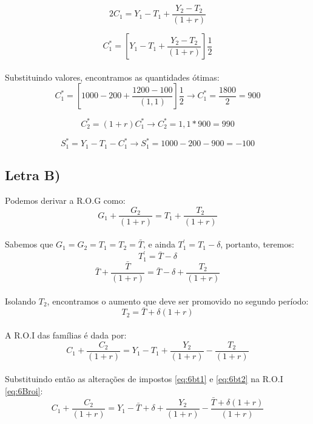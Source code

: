 \documentclass{article}
\begin{document}
\begin{equation}
    2C_1 = Y_1 - T_1 + \frac{Y_2-T_2}{(1+r)}
\end{equation}

\begin{equation}
    C_1^* = \left[Y_1 - T_1 + \frac{Y_2-T_2}{(1+r)}\right]\frac{1}{2}
\end{equation}
\\
Substituindo valores, encontramos as quantidades ótimas:
\begin{equation}
    C_1^* = \left[1000 - 200 + \frac{1200-100}{(1,1)}\right]\frac{1}{2} \to C_1^* = \frac{1800}{2} = 900
\end{equation}

\begin{equation}
    C_2^* = (1+r)C_1^* \to C_2^* = 1,1*900 = 990
\end{equation}

\begin{equation}
    S_1^* = Y_1-T_1-C_1^* \to S_1^*=1000-200-900 = -100
\end{equation}
\clearpage

\subsection*{Letra B)}
Podemos derivar a R.O.G como:
\begin{equation}\label{eq:6Brog}
    G_1 + \frac{G_2}{(1+r)} = T_1 + \frac{T_2}{(1+r)}
\end{equation}
\\
Sabemos que $G_1=G_2=T_1=T_2=\bar{T}$, e ainda $T_{1}^{'}=T_1-\delta$, portanto, teremos:
\begin{equation}\label{eq:6bt1}
    T_{1}^{'}=\bar{T}-\delta
\end{equation}
\begin{equation}
    \bar{T}+\frac{\bar{T}}{(1+r)}=\bar{T}-\delta+\frac{T_2}{(1+r)}
\end{equation}
\\
Isolando $T_2$, encontramos o aumento que deve ser promovido no segundo período:
\begin{equation}\label{eq:6bt2}
    T_2=\bar{T}+\delta(1+r)
\end{equation}
\\
A R.O.I das famílias é dada por:
\begin{equation}\label{eq:6Broi}
    C_1 + \frac{C_2}{(1+r)} = Y_1 - T_1 + \frac{Y_2}{(1+r)}-\frac{T_2}{(1+r)}
\end{equation}
\\
Substituindo então as alterações de impostos \eqref{eq:6bt1} e \eqref{eq:6bt2} na R.O.I \eqref{eq:6Broi}:
\begin{equation}
    C_1 + \frac{C_2}{(1+r)} = Y_1 - \bar{T}+\delta + \frac{Y_2}{(1+r)}-\frac{\bar{T}+\delta(1+r)}{(1+r)}
\end{equation}
\end{document}
